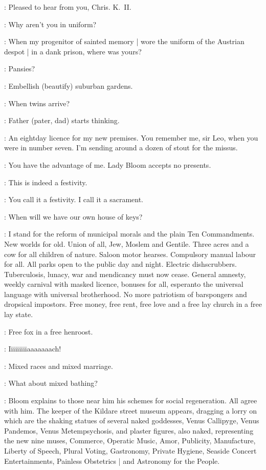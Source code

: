 \Bloom:
Pleased to hear from you,
Chris.
K.~II.

\JoeHynes[2]:
Why aren't you in uniform?%

\Bloom:
When my progenitor of sainted memory |
wore the uniform of the Austrian despot |
in a dank prison,
where was yours?

\BenDollard[1]:
Pansies?

\Bloom:
Embellish (beautify) suburban gardens.

\BenDollard[1]:
When twins arrive?

\Bloom:
Father (pater, dad) starts thinking.

\LarryORourke[2]:
An eightday licence for my new premises.
You remember me,
sir Leo,
when you were in number seven.
I'm sending around a dozen of stout for the missus.

\Bloom:
You have the advantage of me.
Lady Bloom accepts no presents.

\Crofton[1]:
This is indeed a festivity.

\Bloom:
You call it a festivity.
I call it a sacrament.

\AlexanderKeyes[2]:
When will we have our own house of keys?

\Bloom:
I stand for the reform of municipal morals and the plain Ten Commandments.
New worlds for old.
Union of all,
Jew,
Moslem and Gentile.
Three acres and a cow for all children of nature.
Saloon motor hearses.
Compulsory manual labour for all.
All parks open to the public day and night.
Electric dishscrubbers.
Tuberculosis,
lunacy,
war and mendicancy must now cease.
General amnesty,
weekly carnival with masked licence,
bonuses for all,
esperanto the universal language with universal brotherhood.
No more patriotism of barspongers and dropsical impostors.
Free money,
free rent,
free love and a free lay church in a free lay state.

\OMaddenBurke[1]:
Free fox in a free henroost.

\DavyByrne[2]:
Iiiiiiiiiaaaaaaach!

\Bloom:
Mixed races and mixed marriage.

\Lenehan[1]:
What about mixed bathing?

:
Bloom explains to those near him his schemes for social regeneration.
All agree with him.
The keeper of the Kildare street museum appears,
dragging a lorry on which are the shaking statues of several naked goddesses,
Venus Callipyge,
Venus Pandemos,
Venus Metempsychosis,
and plaster figures,
also naked,
representing the new nine muses,
Commerce,
Operatic Music,
Amor,
Publicity,
Manufacture,
Liberty of Speech,
Plural Voting,
Gastronomy,
Private Hygiene,
Seaside Concert Entertainments,
Painless Obstetrics |
and Astronomy for the People.

